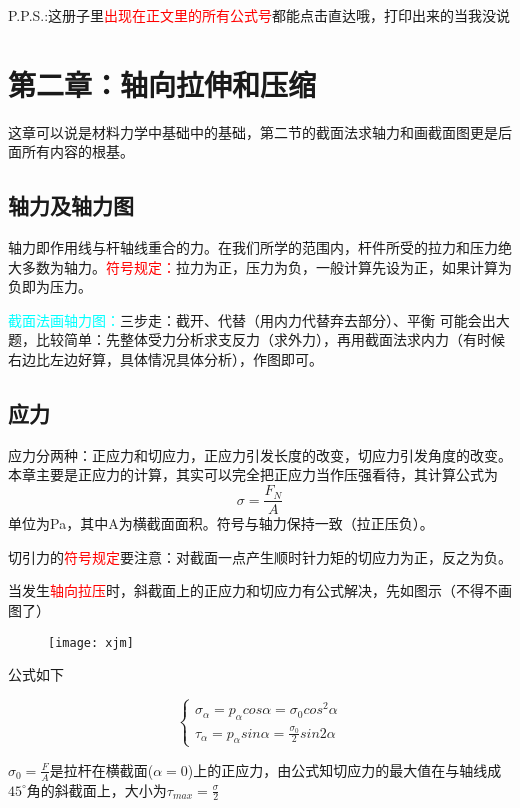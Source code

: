 \documentclass[10pt,a4paper]{ctexart}
\begin{document}
P.P.S.:这册子里\textcolor{red}{出现在正文里的所有公式号}都能点击直达哦，打印出来的当我没说
\section{第二章：轴向拉伸和压缩}
这章可以说是材料力学中基础中的基础，第二节的截面法求轴力和画截面图更是后面所有内容的根基。
\subsection{轴力及轴力图}
轴力即作用线与杆轴线重合的力。在我们所学的范围内，杆件所受的拉力和压力绝大多数为轴力。\textcolor{red}{符号规定：}拉力为正，压力为负，一般计算先设为正，如果计算为负即为压力。

\textcolor{cyan}{截面法画轴力图：}三步走：截开、代替（用内力代替弃去部分）、平衡
可能会出大题，比较简单：先整体受力分析求支反力（求外力），再用截面法求内力（有时候右边比左边好算，具体情况具体分析），作图即可。
\subsection{应力}
应力分两种：正应力和切应力，正应力引发长度的改变，切应力引发角度的改变。本章主要是正应力的计算，其实可以完全把正应力当作压强看待，其计算公式为
\begin{equation}
	\sigma=\frac{F_N}{A}
	\label{zyl}
\end{equation}
单位为Pa，其中A为横截面面积。符号与轴力保持一致（拉正压负）。

切引力的\textcolor{red}{符号规定}要注意：对截面一点产生顺时针力矩的切应力为正，反之为负。

当发生\textcolor{red}{轴向拉压}时，斜截面上的正应力和切应力有公式解决，先如图示（不得不画图了）
\begin{figure}[htp]%
	\centering
	\texttt{[image: xjm]}
\end{figure}

公式如下

\begin{equation}
	\begin{cases}
		\sigma_\alpha=p_\alpha cos\alpha =\sigma_0 cos^2\alpha\\
		\tau_\alpha=p_\alpha sin\alpha  = \frac{\sigma_0}{2}sin2\alpha
	\end{cases}
\end{equation}

$\sigma_0=\frac{F}{A}$是拉杆在横截面($\alpha=0$)上的正应力，由公式知切应力的最大值在与轴线成$45^{\circ}$角的斜截面上，大小为$\tau_{max}=\frac{\sigma}{2}$
\end{document}
